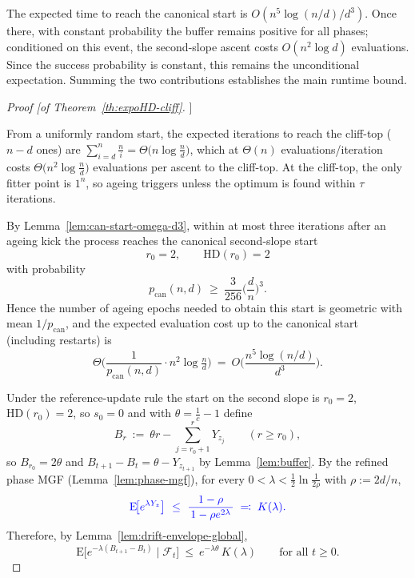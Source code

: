 \documentclass[lettersize,journal]{IEEEtran}
\newcommand{\EE}{\text{E}}
\newcommand{\HD}{\text{HD}}
\begin{document}
{The expected time to reach the canonical start is 
$O(n^{5}\log(n/d)/d^{3})$.  
Once there, with constant probability the buffer remains positive for all 
phases; conditioned on this event, the second-slope ascent costs 
$O(n^{2}\log d)$ evaluations.  
Since the success probability is constant, this remains the unconditional 
expectation.  
Summing the two contributions establishes the main runtime bound.

\begin{proof}[Proof [of Theorem~\ref{th:expoHD-cliff}]]
	
	From a uniformly random start, the expected iterations to reach the cliff-top ($n-d$ ones) are
	$\sum_{i=d}^{n}\frac{n}{i}=\Theta\!\big(n\log\tfrac{n}{d}\big)$, which at $\Theta(n)$ evaluations/iteration costs
	$\Theta\!\big(n^{2}\log\tfrac{n}{d}\big)$ evaluations per ascent to the cliff-top. At the cliff-top, the only fitter point is $1^n$, so ageing triggers unless the optimum is found within $\tau$ iterations.
	
	By Lemma~\ref{lem:can-start-omega-d3}, within at most three iterations after an ageing kick the process reaches the canonical second-slope start
	\[
	r_0=2,\qquad \HD(r_0)=2
	\]
	with probability
	\[
	p_{\mathrm{can}}(n,d)\ \ge\ \frac{3}{256}\Big(\frac{d}{n}\Big)^{\!3}.
	\]
	Hence the number of ageing epochs needed to obtain this start is geometric with mean $1/p_{\mathrm{can}}$, and the expected evaluation cost up to the canonical start (including restarts) is
	\[
	\Theta\!\Big(\frac{1}{p_{\mathrm{can}}(n,d)}\cdot n^{2}\log\tfrac{n}{d}\Big)
	\ =\ O\!\Big(\frac{n^{5}\log(n/d)}{d^{3}}\Big).
	\]
	
	\smallskip
	Under the reference-update rule the start on the second slope is $r_0=2$, $\HD(r_0)=2$, so $s_0=0$ and with $\theta=\tfrac1c-1$ define
	\[
	B_r\ :=\ \theta r - \sum_{j=r_0+1}^{r} Y_{z_j}\qquad(r\ge r_0),
	\]
	so $B_{r_0}=2\theta$ and $B_{t+1}-B_t=\theta-Y_{z_{t+1}}$ by Lemma~\ref{lem:buffer}.
	By the refined phase MGF (Lemma~\ref{lem:phase-mgf}), for every $0<\lambda<\tfrac12\ln\!\tfrac{1}{2\rho}$ with $\rho:=2d/n$,
	\[
	\textcolor{blue}{\EE\!\big[e^{\lambda Y_z}\big]\ \le\ \frac{1-\rho}{\,1-\rho e^{2\lambda}\,} \;\eqqcolon\; K(\lambda).}
	\]
	Therefore, by Lemma~\ref{lem:drift-envelope-global},
	\[
	\EE\!\big[e^{-\lambda(B_{t+1}-B_t)}\mid\mathcal F_t\big]\ \le\ e^{-\lambda\theta}\,K(\lambda)\qquad\text{for all }t\ge 0.
	\]
	

\end{proof}}
\end{document}
